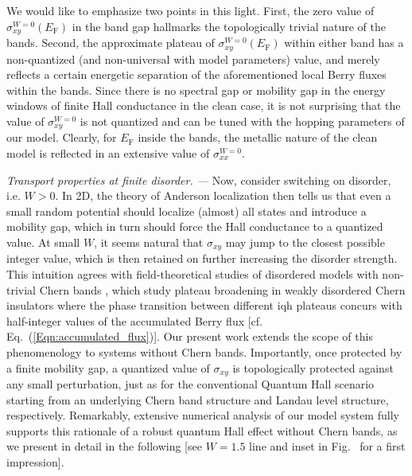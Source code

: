 \documentclass[aps,prl,amsmath,amssymb,twocolumn, superscriptaddress]{revtex4-2}
\newcommand{\eq}[1]{Eq.~(\ref{#1})}
\begin{document}
We would like to emphasize two points in this light. First, the zero value of $\sigma_{xy}^{W=0}(E_\mathrm{F})$ in the band gap hallmarks the topologically trivial nature of the bands. Second, the approximate plateau of $\sigma_{xy}^{W=0}(E_\mathrm{F})$ within either band has a non-quantized (and non-universal with model parameters) value, and merely reflects a certain energetic separation of the aforementioned local Berry fluxes within the bands. Since there is no spectral gap or mobility gap in the energy windows of finite Hall conductance in the clean case, it is not surprising that the value of $\sigma_{xy}^{W=0}$ is not quantized and can be tuned with the hopping parameters of our model. Clearly, for $E_\mathrm{F}$ inside the bands, the metallic nature of the clean model is reflected in an extensive value of $\sigma_{xx}^{W=0}$. 

{\it Transport properties at finite disorder. ---}
Now, consider switching on disorder, i.e. $W>0$. In 2D, the theory of Anderson localization then tells us that even a small random potential should localize (almost) all states and introduce a mobility gap, which in turn should force the Hall conductance to a quantized value. At small $W$, it seems natural that $\sigma_{xy}$ may jump to the closest possible integer value, which is then retained on further increasing the disorder strength. This intuition agrees with field-theoretical studies of disordered models with non-trivial Chern bands \cite{Pruisken_1, Pruisken_2, Pruisken_3, Khmelnitskii, Disordered_graphene, field_theory_disordered_CI}, which study plateau broadening in weakly disordered Chern insulators where the phase transition between different \gls{iqh} plateaus concurs with half-integer values of the accumulated Berry flux [cf. \eq{Eqn:accumulated_flux}]. Our present work extends the scope of this phenomenology to systems without Chern bands. Importantly, once protected by a finite mobility gap, a quantized value of $\sigma_{xy}$ is topologically protected against any small perturbation, just as for the conventional Quantum Hall scenario starting from an underlying Chern band structure and Landau level structure, respectively. Remarkably, extensive numerical analysis of our model system fully supports this rationale of a robust quantum Hall effect without Chern bands, as we present in detail in the following [see $W=1.5$ line and inset in Fig.~ for a first impression]. 
\end{document}
